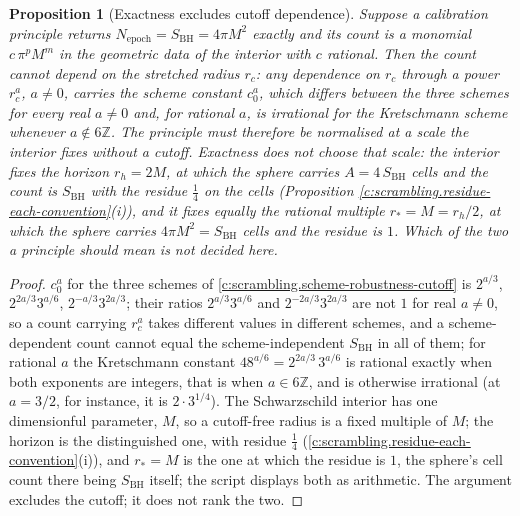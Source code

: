 \documentclass[11pt]{article}
\newtheorem{proposition}[theorem]{Proposition}
\theoremstyle{definition}
\theoremstyle{plain}
\newcommand{\changedmark}[2]{\marginpar{\raggedright\scriptsize\color{#1}#2}}
\providecommand{\SBH}{}\renewcommand{\SBH}{S_{\mathrm{BH}}}
\begin{document}
\begin{proposition}[Exactness excludes cutoff dependence]\label{c:scrambling.exactness-excludes-cutoff-dependence}
\changedmark{gray}{reworded}
Suppose a calibration principle returns $N_{\mathrm{epoch}} = \SBH = 4\pi M^2$ exactly and its count is a monomial $c\,\pi^p M^m$ in the geometric data of the interior with $c$ rational. Then the count cannot depend on the stretched radius $r_c$: any dependence on $r_c$ through a power $r_c^a$, $a \neq 0$, carries the scheme constant $c_0^a$, which differs between the three schemes for every real $a \neq 0$ and, for rational $a$, is irrational for the Kretschmann scheme whenever $a \notin 6\mathbb{Z}$. The principle must therefore be normalised at a scale the interior fixes without a cutoff. Exactness does not choose that scale: the interior fixes the horizon $r_h = 2M$, at which the sphere carries $A = 4\,\SBH$ cells and the count is $\SBH$ with the residue $\tfrac14$ on the cells (Proposition \ref{c:scrambling.residue-each-convention}(i)), and it fixes equally the rational multiple $r_* = M = r_h/2$, at which the sphere carries $4\pi M^2 = \SBH$ cells and the residue is $1$. Which of the two a principle should mean is not decided here.
\end{proposition}
\begin{proof}
$c_0^a$ for the three schemes of \ref{c:scrambling.scheme-robustness-cutoff} is $2^{a/3}$, $2^{2a/3}3^{a/6}$, $2^{-a/3}3^{2a/3}$; their ratios $2^{a/3}3^{a/6}$ and $2^{-2a/3}3^{2a/3}$ are not $1$ for real $a \neq 0$, so a count carrying $r_c^a$ takes different values in different schemes, and a scheme-dependent count cannot equal the scheme-independent $\SBH$ in all of them; for rational $a$ the Kretschmann constant $48^{a/6} = 2^{2a/3}\,3^{a/6}$ is rational exactly when both exponents are integers, that is when $a \in 6\mathbb{Z}$, and is otherwise irrational (at $a = 3/2$, for instance, it is $2\cdot 3^{1/4}$). The Schwarzschild interior has one dimensionful parameter, $M$, so a cutoff-free radius is a fixed multiple of $M$; the horizon is the distinguished one, with residue $\tfrac14$ (\ref{c:scrambling.residue-each-convention}(i)), and $r_* = M$ is the one at which the residue is $1$, the sphere's cell count there being $\SBH$ itself; the script displays both as arithmetic. The argument excludes the cutoff; it does not rank the two.

\end{proof}
\end{document}
